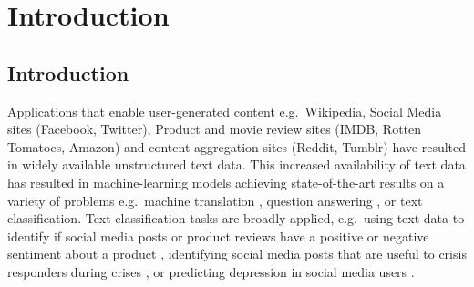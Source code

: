 \chapter{Introduction}





\section{Introduction}



Applications that enable user-generated content e.g.\ Wikipedia, Social Media sites (Facebook, Twitter), Product and movie review sites (IMDB, Rotten Tomatoes, Amazon) and content-aggregation sites (Reddit, Tumblr) have resulted in widely available unstructured text data. This increased availability of text data has resulted in machine-learning models achieving state-of-the-art results on  a variety of problems e.g.\ machine translation \cite{Wu}, question answering \cite{Fisch2016}, or text classification. Text classification tasks are broadly applied, e.g.\  using text data to identify if social media posts or product reviews have a positive or negative sentiment about a product \cite{Burel2018},  identifying social media posts  that are useful to crisis responders during crises \cite{Burel2018}, or  predicting depression in social media users \cite{Aldarwish2017}. 


